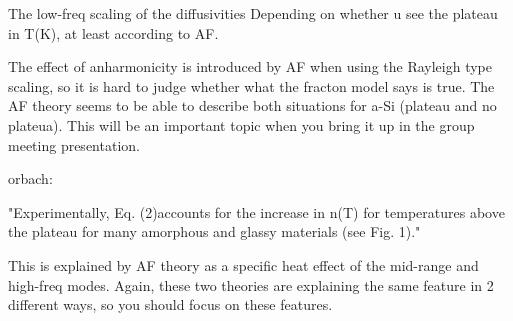 \documentclass{article}
\begin{document}
The low-freq scaling of the diffusivities Depending on whether 
u see the plateau in T(K), at least according to AF. 

The effect of anharmonicity is introduced by AF when using 
the Rayleigh type scaling, so it is hard 
to judge whether what the fracton model says is true.  The AF theory 
seems to be able to describe both situations for a-Si (plateau and 
no plateua). This will be an important 
topic when you bring it up in the group meeting presentation.

orbach:

"Experimentally, Eq. (2)accounts for
the increase in n(T) for temperatures
above the plateau for many amorphous
and glassy materials (see Fig. 1)."

This is explained by AF theory as a specific heat effect of the mid-range 
and high-freq modes.  Again, these two theories are explaining the 
same feature in 2 different ways, so you should focus on these features. 

\end{document}
